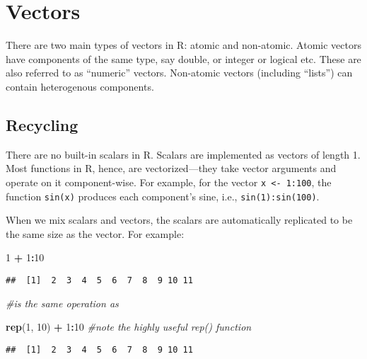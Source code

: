 \documentclass[12pt,]{article}
\newenvironment{Shaded}{\begin{snugshade}}{\end{snugshade}}
\newcommand{\KeywordTok}[1]{\textcolor[rgb]{0.13,0.29,0.53}{\textbf{#1}}}
\newcommand{\DecValTok}[1]{\textcolor[rgb]{0.00,0.00,0.81}{#1}}
\newcommand{\StringTok}[1]{\textcolor[rgb]{0.31,0.60,0.02}{#1}}
\newcommand{\CommentTok}[1]{\textcolor[rgb]{0.56,0.35,0.01}{\textit{#1}}}
\newcommand{\OperatorTok}[1]{\textcolor[rgb]{0.81,0.36,0.00}{\textbf{#1}}}
\newcommand{\NormalTok}[1]{#1}
\begin{document}
\section{Vectors}\label{vectors}

There are two main types of vectors in R: atomic and non-atomic. Atomic
vectors have components of the same type, say double, or integer or
logical etc. These are also referred to as ``numeric'' vectors.
Non-atomic vectors (including ``lists'') can contain heterogenous
components.

\subsection{Recycling}\label{recycling}

There are no built-in scalars in R. Scalars are implemented as vectors
of length 1. Most functions in R, hence, are vectorized---they take
vector arguments and operate on it component-wise. For example, for the
vector \texttt{x\ \textless{}-\ 1:100}, the function \texttt{sin(x)}
produces each component's sine, i.e., \texttt{sin(1):sin(100)}.

When we mix scalars and vectors, the scalars are automatically
replicated to be the same size as the vector. For example:

\begin{Shaded}
\begin{Highlighting}[]
\DecValTok{1} \OperatorTok{+}\StringTok{ }\DecValTok{1}\OperatorTok{:}\DecValTok{10}
\end{Highlighting}
\end{Shaded}

\begin{verbatim}
##  [1]  2  3  4  5  6  7  8  9 10 11
\end{verbatim}

\begin{Shaded}
\begin{Highlighting}[]
\CommentTok{#is the same operation as }

\KeywordTok{rep}\NormalTok{(}\DecValTok{1}\NormalTok{, }\DecValTok{10}\NormalTok{) }\OperatorTok{+}\StringTok{ }\DecValTok{1}\OperatorTok{:}\DecValTok{10} \CommentTok{#note the highly useful rep() function}
\end{Highlighting}
\end{Shaded}

\begin{verbatim}
##  [1]  2  3  4  5  6  7  8  9 10 11
\end{verbatim}
\end{document}
